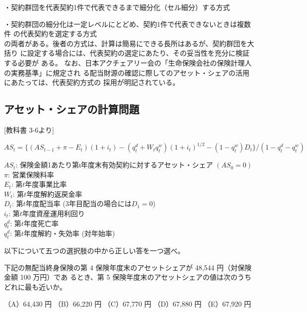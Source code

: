 \documentclass[report,gutter=10mm,fore-edge=10mm,uplatex,dvipdfmx]{jlreq}
\begin{document}
・契約群団を代表契約1件で代表できるまで細分化（セル細分）する方式

・契約群団の細分化は一定レベルにとどめ、契約1件で代表できないときは複数件
の代表契約を選定する方式\\
の両者がある。後者の方式は、計算は簡易にできる長所はあるが、契約群団を大括り
に設定する場合には、代表契約の選定にあたり、その妥当性を充分に検証する必要が
ある。
なお、日本アクチェアリー会の「生命保険会社の保険計理人の実務基準」に規定され
る配当財源の確認に際してのアセット・シェアの活用にあたっては、代表契約方式の
採用が明記されている。

\subsection{アセット・シェアの計算問題}

[教科書 3-6より]

$
AS_t=\{(AS_{t-1}+\pi - E_t)(1+i_t) - (q_t^d+W_tq_t^w)(1+i_t)^{1/2}-(1-q_t^w)D_t\}/(1-q_t^d-q_t^w)
$

\noindent
$AS_t$: 保険金額1あたり第ι年度末有効契約に対するアセット・シェア $(AS_0=0)$\\
$\pi$: 営業保険料率\\
$E_t$: 第$t$年度事業比率\\
$W_t$: 第$t$年度解約返戻金率\\
$D_t$: 第$t$年度配当率 (3年目配当の場合には$D_1=0$)\\
$i_t$: 第$t$年度資産運用利回り\\
$q_t^d$: 第$t$年度死亡率\\
$q_t^d$: 第$t$年度解約・失効率 (対年始率)

以下について五つの選択肢の中から正しい答を一つ選べ。

下記の無配当終身保険の第 4 保険年度末のアセットシェアが 48,544 円（対保険金額 100 万円）であ
るとき、第 5 保険年度末のアセットシェアの値は次のうちどれに最も近いか。

（A）64,430 円
（B）66,220 円
（C）67,770 円
（D）67,880 円
（E）67,920 円
\end{document}
